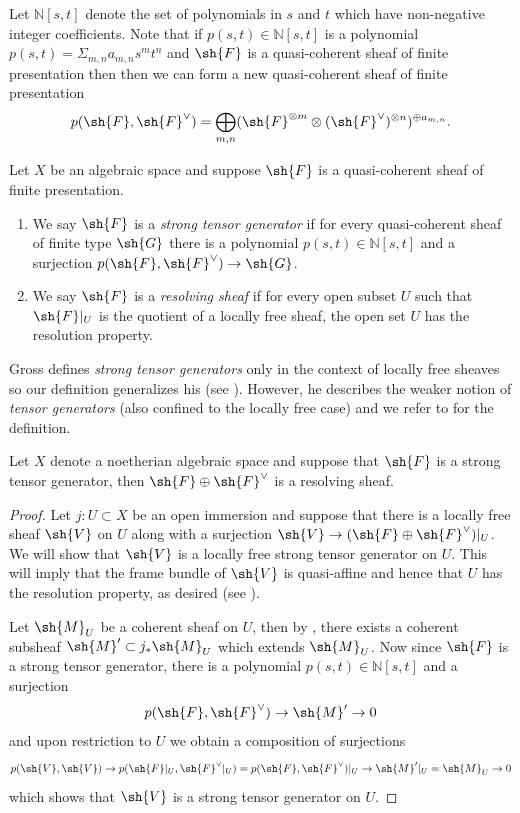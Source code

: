 \documentclass[12pt]{amsart}
\begin{document}
Let $\mathbb{N}[s,t]$ denote the set of polynomials in $s$ and $t$ which have non-negative integer coefficients. Note that if $p(s,t) \in \mathbb{N}[s,t]$ is a polynomial $p(s,t)=\Sigma_{m,n} a_{m,n}s^mt^n$ and $\sh{F}$ is a quasi-coherent sheaf of finite presentation then then we can form a new quasi-coherent sheaf of finite presentation
\[p(\sh{F},\sh{F}^{\vee})=\bigoplus_{m,n} (\sh{F}^{\otimes m} \otimes (\sh{F}^{\vee})^{\otimes n})^{\oplus a_{m,n}}.\]

\begin{definition} Let $X$ be an algebraic space and suppose $\sh{F}$ is a quasi-coherent sheaf of finite presentation.
\begin{enumerate}
\item We say $\sh{F}$ is a \emph{strong tensor generator} if for every quasi-coherent sheaf of finite type $\sh{G}$ there is a polynomial $p(s,t) \in \mathbb{N}[s,t]$ and a surjection $p(\sh{F},\sh{F}^{\vee}) \to \sh{G}$.  
\item We say $\sh{F}$ is a \emph{resolving sheaf} if for every open subset $U$ such that $\sh{F}|_U$ is the quotient of a locally free sheaf, the open set $U$ has the resolution property. \end{enumerate} \end{definition}

\begin{remark} Gross defines \emph{strong tensor generators} only in the context of locally free sheaves so our definition generalizes his (see \cite[Definition 5.1]{GrossRes}). However, he describes the weaker notion of \emph{tensor generators} (also confined to the locally free case) and we refer to \cite[Def. 5.1]{GrossRes} for the definition. \end{remark}

\begin{proposition} \label{prop:strongresolve} Let $X$ denote a noetherian algebraic space and suppose that $\sh{F}$ is a strong tensor generator, then $\sh{F} \oplus \sh{F}^{\vee}$ is a resolving sheaf. \end{proposition} 

\begin{proof} Let $j: U \subset X$ be an open immersion and suppose that there is a locally free sheaf $\sh{V}$ on $U$ along with a surjection $\sh{V} \to (\sh{F} \oplus \sh{F}^{\vee})|_U$. We will show that $\sh{V}$ is a locally free strong tensor generator on $U$. This will imply that the frame bundle of $\sh{V}$ is quasi-affine and hence that $U$ has the resolution property, as desired (see \cite[Thm. 1.1]{GrossRes}).

Let $\sh{M}_U$ be a coherent sheaf on $U$, then by \cite[Cor. 15.5]{champs}, there exists a coherent subsheaf $\sh{M}' \subset j_*\sh{M}_U$ which extends $\sh{M}_U$. Now since $\sh{F}$ is a strong tensor generator, there is a polynomial $p(s,t) \in \mathbb{N}[s,t]$ and a surjection
\[p(\sh{F},\sh{F}^{\vee}) \to \sh{M}' \to 0\]
and upon restriction to $U$ we obtain a composition of surjections
\[p(\sh{V}, \sh{V}) \to p(\sh{F}|_U,\sh{F}^{\vee}|_U)=p(\sh{F},\sh{F}^{\vee})|_U \to \sh{M}'|_U=\sh{M}_U \to 0\]
which shows that $\sh{V}$ is a strong tensor generator on $U$. \end{proof}
\end{document}
